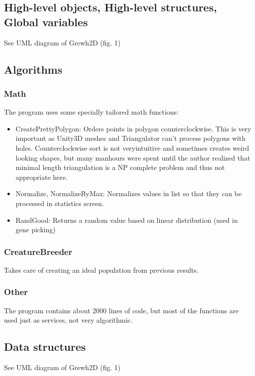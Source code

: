 \documentclass[a4paper]{article}
\begin{document}
\subsection*{High-level objects, High-level structures, Global variables}
	See UML diagram of Grewh2D (fig. 1)
\subsection*{Algorithms}
	\subsubsection*{Math}
		The program uses some specially tailored math functions:
		\begin{itemize}
			\item{CreatePrettyPolygon:} \hspace{0.3cm} Orders points in polygon counterclockwise. This is very important as Unity3D meshes and Triangulator can't process polygons with holes. Counterclockwise sort is not veryintuitive and sometimes creates weird looking shapes, but many manhours were spent until the author realized that minimal length triangulation is a NP complete problem and thus not appropriate here.
			\item{Normalize, NormalizeByMax:} \hspace{0.3cm} Normalizes values in list so that they can be processed in statistics screen.
			\item{RandGood:} \hspace{0.3cm} Returns a random value based on linear distribution (used in gene picking) 
		\end{itemize}
	\subsubsection*{CreatureBreeder}
		Takes care of creating an ideal population from previous results.
	\subsubsection*{Other}
		The program contains about 2000 lines of code, but most of the functions are used just as services, not very algorithmic.
\subsection*{Data structures}
See UML diagram of Grewh2D (fig. 1)
	
\pagebreak

\end{document}
